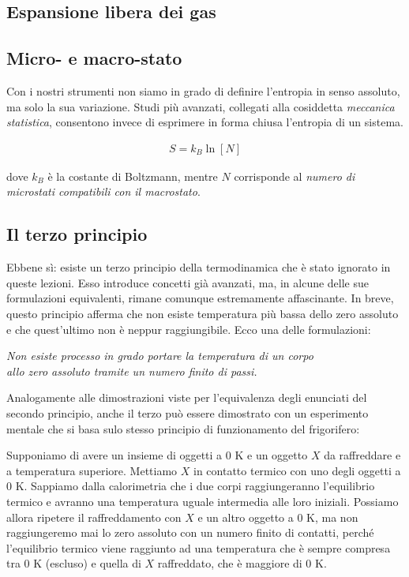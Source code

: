 \subsection{Espansione libera dei gas}

\subsection{Micro- e macro-stato}
Con i nostri strumenti non siamo in grado di definire l'entropia in
senso assoluto, ma solo la sua variazione. Studi più avanzati,
collegati alla cosiddetta \textit{meccanica statistica}, consentono
invece di esprimere in forma chiusa l'entropia di un sistema.

\begin{align}
    S = k_B \ln [N]
\end{align}

\noindent dove $k_B$ è la costante di Boltzmann, mentre $N$
corrisponde al \textit{numero di microstati compatibili con il
macrostato}.


\subsection{Il terzo principio}
Ebbene sì: esiste un terzo principio della termodinamica che è stato
ignorato in queste lezioni. Esso introduce concetti già avanzati, ma,
in alcune delle sue formulazioni equivalenti, rimane comunque estremamente
affascinante. In breve, questo principio afferma che non esiste
temperatura più bassa dello zero assoluto e che quest'ultimo non è
neppur raggiungibile. Ecco una delle formulazioni:

\begin{center}
    \textit{Non esiste processo in grado portare la temperatura di un corpo\\allo
    zero assoluto tramite un numero finito di passi.}
\end{center}

\noindent Analogamente alle dimostrazioni viste per l'equivalenza
degli enunciati del secondo principio, anche il terzo può essere
dimostrato con un esperimento mentale che si basa sulo stesso principio
di funzionamento del frigorifero:

Supponiamo di avere un insieme di oggetti a 0 K e un oggetto $X$ da
raffreddare e a temperatura superiore. Mettiamo $X$ in
contatto termico con uno degli oggetti a 0 K. Sappiamo dalla calorimetria
che i due corpi raggiungeranno l'equilibrio termico e avranno una
temperatura uguale intermedia alle loro iniziali. Possiamo allora
ripetere il raffreddamento con $X$ e un altro oggetto a 0 K, ma
non raggiungeremo mai lo zero assoluto con un numero finito di
contatti, perché l'equilibrio termico viene raggiunto ad una temperatura
che è sempre compresa tra 0 K (escluso) e quella di $X$ raffreddato, che
è maggiore di 0 K.

